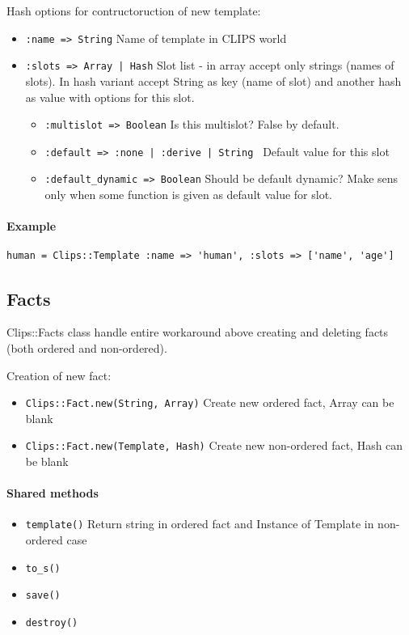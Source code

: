 \documentclass[a4paper,10pt]{article}
\begin{document}
Hash options for contructoruction of new template:
\begin{itemize}
 \item \texttt{:name => String} Name of template in CLIPS world
 \item \texttt{:slots => Array | Hash} Slot list - in array accept only strings (names of slots). In hash variant accept String as key (name of slot) and another hash as value with options for this slot.
	\begin{itemize}
	 \item \texttt{:multislot => Boolean} Is this multislot? False by default.
	 \item \texttt{:default => :none | :derive | String } Default value for this slot
	 \item \texttt{:default\_dynamic => Boolean} Should be default dynamic? Make sens only when some function is given as default value for slot.
	\end{itemize}
\end{itemize}

\paragraph{Example}
\begin{verbatim}
human = Clips::Template :name => 'human', :slots => ['name', 'age']
\end{verbatim}

\subsection{Facts}
Clips::Facts class handle entire workaround above creating and deleting facts (both ordered and non-ordered). 

Creation of new fact:
\begin{itemize}
 \item \texttt{Clips::Fact.new(String, Array)} Create new ordered fact, Array can be blank
 \item \texttt{Clips::Fact.new(Template, Hash)} Create new non-ordered fact, Hash can be blank
\end{itemize}

\paragraph{Shared methods}
\begin{itemize}
 \item \texttt{template()} Return string in ordered fact and Instance of Template in non-ordered case
 \item \texttt{to\_s()}
 \item \texttt{save()}
 \item \texttt{destroy()}
\end{itemize}
\end{document}
